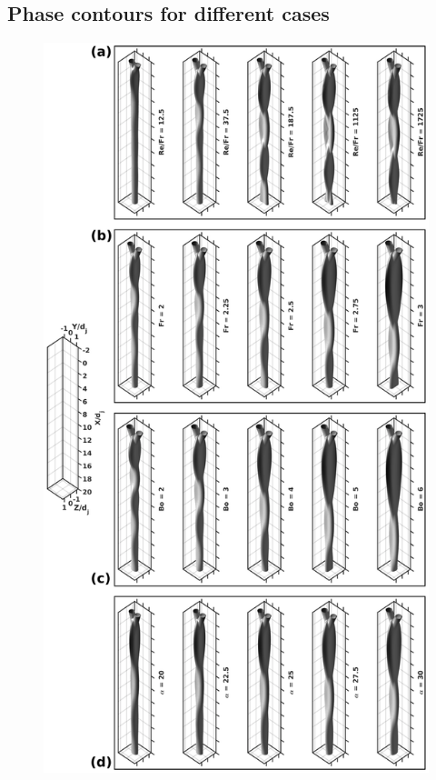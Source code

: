 \documentclass[%
aip,
sd,%
amsmath,amssymb,
preprint,%
author-year,%
]{revtex4-1}
\begin{document}
\subsection{Phase contours for different cases}
\lipsum[1]
\begin{figure}
	\centering
	\includegraphics[width=\linewidth]{phaseContours}
	\caption{}
	\label{Figure::phaseContours}
\end{figure}
\end{document}
